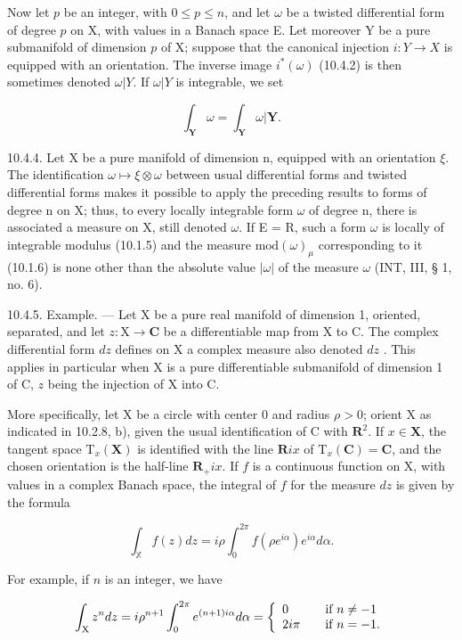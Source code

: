 Now let \(p\) be an integer, with \(0 \leqslant p \leqslant n\), and let \(\omega\) be a twisted differential form of degree \(p\) on X, with values in a Banach space E. Let moreover Y be a pure submanifold of dimension \(p\) of X; suppose that the canonical injection \(i: Y \to X\) is equipped with an orientation. The inverse image \(i^{*}(\omega)\) (10.4.2) is then sometimes denoted \(\omega|Y\). If \(\omega|Y\) is integrable, we set

\[
\int_ {\mathbf {Y}} \omega = \int_ {\mathbf {Y}} \omega | \mathbf {Y}.
\]

10.4.4. Let X be a pure manifold of dimension n, equipped with an orientation \(\xi\). The identification \(\omega \mapsto \xi \otimes \omega\) between usual differential forms and twisted differential forms makes it possible to apply the preceding results to forms of degree n on X; thus, to every locally integrable form \(\omega\) of degree n, there is associated a measure on X, still denoted \(\omega\). If E = R, such a form \(\omega\) is locally of integrable modulus (10.1.5) and the measure \(\text{mod}(\omega)_{\mu}\) corresponding to it (10.1.6) is none other than the absolute value \(|\omega|\) of the measure \(\omega\) (INT, III, § 1, no. 6).

10.4.5. Example. --- Let X be a pure real manifold of dimension 1, oriented, separated, and let \(z: \mathrm{X} \to \mathbf{C}\) be a differentiable map from X to C. The complex differential form \(dz\) defines on X a complex measure also denoted \(dz\) . This applies in particular when X is a pure differentiable submanifold of dimension 1 of C, \(z\) being the injection of X into C.

More specifically, let X be a circle with center 0 and radius \(\rho > 0\); orient X as indicated in 10.2.8, b), given the usual identification of C with \(\mathbf{R}^2\). If \(x \in \mathbf{X}\), the tangent space \(\mathrm{T}_x(\mathbf{X})\) is identified with the line \(\mathbf{R}ix\) of \(\mathrm{T}_x(\mathbf{C}) = \mathbf{C}\), and the chosen orientation is the half-line \(\mathbf{R}_+ix\). If \(f\) is a continuous function on X, with values in a complex Banach space, the integral of \(f\) for the measure \(dz\) is given by the formula

\[
\int_ {\mathbb {X}} f (z) d z = i \rho \int_ {0} ^ {2 \pi} f (\rho e ^ {i \alpha}) e ^ {i \alpha} d \alpha .
\]

For example, if \(n\) is an integer, we have

\[
\int_ {\mathrm{X}} z ^ {n} d z = i \rho^ {n + 1} \int_ {0} ^ {2 \pi} e ^ {(n + 1) i \alpha} d \alpha = \left\{ \begin{array}{l l} 0 & \quad \text {if } n \neq - 1 \\ 2 i \pi & \quad \text {if } n = - 1. \end{array} \right.
\]

